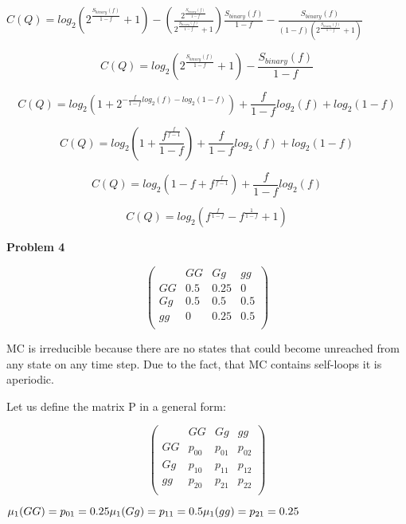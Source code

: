 \documentclass[12pt]{article}
\begin{document}
	$ C(Q) = log_2 \left( 2^{\frac{S_{binary}(f) }{1 - f}}  + 1 \right) - \left( \frac{2^{\frac{S_{binary}(f) }{1 - f}} }{2^{\frac{S_{binary}(f) }{1 - f}}  + 1} \right) \frac{S_{binary}(f) }{1 - f}  - \frac{S_{binary}(f)}{(1 - f)(2^{\frac{S_{binary}(f) }{1 - f}}  + 1)}  $
	
	$$ C(Q) = log_2 \left( 2^{\frac{S_{binary}(f) }{1 - f}}  + 1 \right) - \frac{S_{binary}(f)}{1 - f}  $$
	
	$$ C(Q) = log_2 \left( 1 + 2^{-\frac{f}{1 - f} log_2(f) - log_2(1 - f)} \right) + \frac{f }{1 - f} log_2(f) + log_2(1 - f)  $$
	
	$$ C(Q) = log_2 \left( 1 + \frac{f ^ {\frac{f}{f - 1}} }{1 - f} \right) + \frac{f }{1 - f} log_2(f) + log_2(1 - f)  $$
	
	$$ C(Q) = log_2 \left( 1 - f + f ^ {\frac{f}{f - 1}} \right) + \frac{f }{1 - f} log_2(f)  $$
	
	$$ C(Q) = log_2 \left( f^{\frac{f}{1 - f}} - f^{\frac{1}{1 - f}} + 1 \right)  $$
	
	\bigskip
	
	\textbf{Problem 4}
	
	\bigskip
	
	$$ 
	\left(
	\begin{matrix}
		      & GG & Gg & gg\\
		GG & 0.5 & 0.25 & 0 \\
		Gg & 0.5 & 0.5 & 0.5 \\
		gg & 0  & 0.25 & 0.5 \\
	\end{matrix}
	\right)
	$$
	
	MC is irreducible because there are no states that could become unreached from any state on any time step. Due to the fact, that MC contains self-loops it is aperiodic.
	
	Let us define the matrix P in a general form:
	
	$$
	\left(
	\begin{matrix}
      & GG & Gg & gg\\
      GG & p_{00} & p_{01} & p_{02} \\
      Gg & p_{10} & p_{11} & p_{12} \\
      gg & p_{20}  & p_{21} & p_{22} \\
	\end{matrix}
	\right)
	$$
	
	$
		\\
		\mu_1(GG) = p_{01} = 0.25\\
		\mu_1(Gg) = p_{11} = 0.5\\
		\mu_1(gg) = p_{21} = 0.25
	$
	
\end{document}
